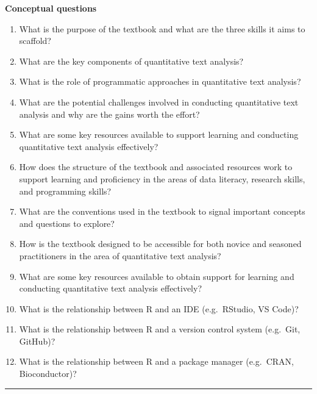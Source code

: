 \documentclass[
  letterpaper,
]{latex/krantz}
\providecommand{\tightlist}{%
  \setlength{\itemsep}{0pt}\setlength{\parskip}{0pt}}\usepackage{longtable,booktabs,array}
\begin{document}
\begin{tcolorbox}[enhanced jigsaw, left=2mm, arc=.35mm, colback=white, rightrule=.15mm, toprule=.15mm, breakable, leftrule=.75mm, opacityback=0, bottomrule=.15mm]

\textbf{Conceptual questions}

\begin{enumerate}
\def\labelenumi{\arabic{enumi}.}
\tightlist
\item
  What is the purpose of the textbook and what are the three skills it
  aims to scaffold?
\item
  What are the key components of quantitative text analysis?
\item
  What is the role of programmatic approaches in quantitative text
  analysis?
\item
  What are the potential challenges involved in conducting quantitative
  text analysis and why are the gains worth the effort?
\item
  What are some key resources available to support learning and
  conducting quantitative text analysis effectively?
\item
  How does the structure of the textbook and associated resources work
  to support learning and proficiency in the areas of data literacy,
  research skills, and programming skills?
\item
  What are the conventions used in the textbook to signal important
  concepts and questions to explore?
\item
  How is the textbook designed to be accessible for both novice and
  seasoned practitioners in the area of quantitative text analysis?
\item
  What are some key resources available to obtain support for learning
  and conducting quantitative text analysis effectively?
\item
  What is the relationship between R and an IDE (e.g.~RStudio, VS Code)?
\item
  What is the relationship between R and a version control system
  (e.g.~Git, GitHub)?
\item
  What is the relationship between R and a package manager (e.g.~CRAN,
  Bioconductor)?
\end{enumerate}

\begin{center}\rule{0.5\linewidth}{0.5pt}\end{center}


\end{tcolorbox}
\end{document}
